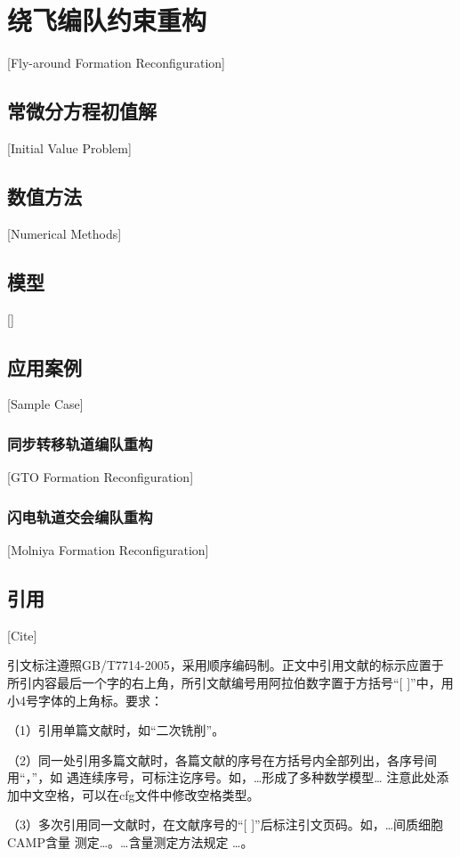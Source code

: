 
\chapter[编队重构]{绕飞编队约束重构}[Fly-around Formation Reconfiguration]	
\section{常微分方程初值解}[Initial Value Problem]

\section{数值方法}[Numerical Methods]
\section{模型}[]
\section{应用案例}[Sample Case]
\subsection{同步转移轨道编队重构}[GTO Formation Reconfiguration]
\subsection{闪电轨道交会编队重构}[Molniya Formation Reconfiguration]

\section{引用}[Cite]

引文标注遵照GB/T7714-2005，采用顺序编码制。正文中引用文献的标示应置于所引内容最后一个字的右上角，所引文献编号用阿拉伯数字置于方括号“[ ]”中，用小4号字体的上角标。要求：

（1）引用单篇文献时，如“二次铣削\cite{cnproceed}”。

（2）同一处引用多篇文献时，各篇文献的序号在方括号内全部列出，各序号间用“，”，如
遇连续序号，可标注讫序号。如，…形成了多种数学模型\cite{cnarticle,cnproceed}…
注意此处添加中文空格，可以在cfg文件中修改空格类型。

（3）多次引用同一文献时，在文献序号的“[ ]”后标注引文页码。如，…间质细胞CAMP含量
测定\cite[100-197]{cnarticle}…。…含量测定方法规定
\cite[92]{cnarticle}…。

